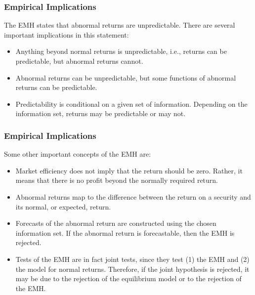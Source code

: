 \documentclass[xcolor=dvipsnames, english, 8pt]{beamer}
\begin{document}
\begin{frame}
    \frametitle{Empirical Implications}
    The EMH states that {\color{ubRed} abnormal} returns are
unpredictable. There are several important implications in this statement: \vspace{0.25cm}\\
\begin{itemize}
    \item Anything beyond normal returns is unpredictable, i.e., returns can be predictable, but abnormal returns cannot.
    \item Abnormal returns can be unpredictable, but some functions of abnormal returns
can be predictable.
\item Predictability is conditional on a given set of information. Depending on the information set, returns may be predictable or may not.
\end{itemize}
\end{frame}

\begin{frame}
    \frametitle{Empirical Implications}
    Some other important concepts of the EMH are:\vspace{0.25cm}\\
    \begin{itemize}
    \item Market efficiency does not imply that the return should be zero. Rather, it means that
    there is no profit beyond the {\color{ubRed} normally required return}.

    \item {\color{ubRed}Abnormal returns} map to the difference between the return on a
    security and its normal, or expected, return.
    \item Forecasts of the abnormal return are constructed using the chosen information set. If
    the abnormal return is forecastable, then the EMH is rejected.
    \item {\color{ubRed}Tests of the EMH are in fact joint tests}, since they test (1) the EMH and (2) the
    model for normal returns. Therefore, if the joint hypothesis is rejected, it may be due to
    the rejection of the equilibrium model or to the rejection of the EMH.
\end{itemize}
\end{frame}
\end{document}

